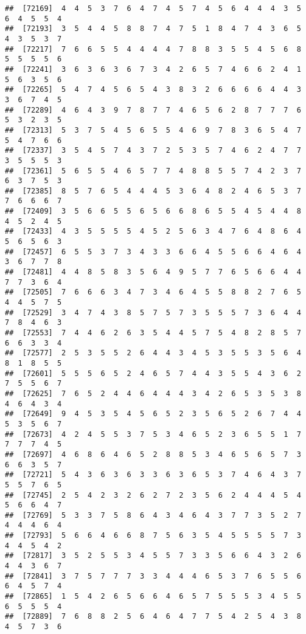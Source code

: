\documentclass[
]{book}
\begin{document}
\begin{verbatim}
##  [72169]  4  4  5  3  7  6  4  7  4  5  7  4  5  6  4  4  4  3  5  6  4  5  5  4
##  [72193]  3  5  4  4  5  8  8  7  4  7  5  1  8  4  7  4  3  6  5  4  3  5  3  7
##  [72217]  7  6  6  5  5  4  4  4  4  7  8  8  3  5  5  4  5  6  8  5  5  5  5  6
##  [72241]  3  6  3  6  3  6  7  3  4  2  6  5  7  4  6  6  2  4  1  5  6  3  5  6
##  [72265]  5  4  7  4  5  6  5  4  3  8  3  2  6  6  6  6  4  4  3  3  6  7  4  5
##  [72289]  4  6  4  3  9  7  8  7  7  4  6  5  6  2  8  7  7  7  6  5  3  2  3  5
##  [72313]  5  3  7  5  4  5  6  5  5  4  6  9  7  8  3  6  5  4  7  5  4  7  6  6
##  [72337]  3  5  4  5  7  4  3  7  2  5  3  5  7  4  6  2  4  7  7  3  5  5  5  3
##  [72361]  5  6  5  5  4  6  5  7  7  4  8  8  5  5  7  4  2  3  7  6  3  7  5  3
##  [72385]  8  5  7  6  5  4  4  4  5  3  6  4  8  2  4  6  5  3  7  7  6  6  6  7
##  [72409]  3  5  6  6  5  5  6  5  6  6  8  6  5  5  4  5  4  4  8  4  5  2  4  5
##  [72433]  4  3  5  5  5  5  4  5  2  5  6  3  4  7  6  4  8  6  4  5  6  5  6  3
##  [72457]  6  5  5  3  7  3  4  3  3  6  6  4  5  5  6  6  4  6  4  3  6  7  7  8
##  [72481]  4  4  8  5  8  3  5  6  4  9  5  7  7  6  5  6  6  4  4  7  7  3  6  4
##  [72505]  7  6  6  6  3  4  7  3  4  6  4  5  5  8  8  2  7  6  5  4  4  5  7  5
##  [72529]  3  4  7  4  3  8  5  7  5  7  3  5  5  5  7  3  6  4  4  7  8  4  6  3
##  [72553]  7  4  4  6  2  6  3  5  4  4  5  7  5  4  8  2  8  5  7  6  6  3  3  4
##  [72577]  2  5  3  5  5  2  6  4  4  3  4  5  3  5  5  3  5  6  4  8  1  8  5  5
##  [72601]  5  5  5  6  5  2  4  6  5  7  4  4  3  5  5  4  3  6  2  7  5  5  6  7
##  [72625]  7  6  5  2  4  4  6  4  4  4  3  4  2  6  5  3  5  3  8  4  6  4  3  4
##  [72649]  9  4  5  3  5  4  5  6  5  2  3  5  6  5  2  6  7  4  4  5  3  5  6  7
##  [72673]  4  2  4  5  5  3  7  5  3  4  6  5  2  3  6  5  5  1  7  7  7  7  4  5
##  [72697]  4  6  8  6  4  6  5  2  8  8  5  3  4  6  5  6  5  7  3  6  6  3  5  7
##  [72721]  5  4  3  6  3  6  3  3  6  3  6  5  3  7  4  6  4  3  7  5  5  7  6  5
##  [72745]  2  5  4  2  3  2  6  2  7  2  3  5  6  2  4  4  4  5  4  5  6  6  4  7
##  [72769]  5  3  3  7  5  8  6  4  3  4  6  4  3  7  7  3  5  2  7  4  4  4  6  4
##  [72793]  5  6  6  4  6  6  8  7  5  6  3  5  4  5  5  5  5  7  3  4  4  5  4  2
##  [72817]  3  5  2  5  5  3  4  5  5  7  3  3  5  6  6  4  3  2  6  4  4  3  6  7
##  [72841]  3  7  5  7  7  7  3  3  4  4  4  6  5  3  7  6  5  5  6  6  4  5  7  4
##  [72865]  1  5  4  2  6  5  6  6  4  6  5  7  5  5  5  3  4  5  5  6  5  5  5  4
##  [72889]  7  6  8  8  2  5  6  4  6  4  7  7  5  4  2  5  4  3  8  4  5  7  3  6

\end{verbatim}
\end{document}
